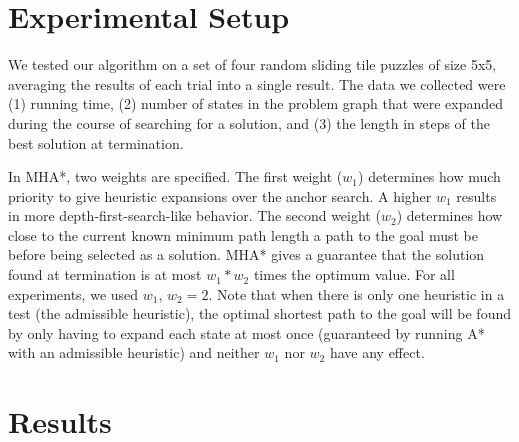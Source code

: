 \documentclass{article}
\begin{document}
\section{Experimental Setup}

We tested our algorithm on a set of four random sliding tile puzzles of size 5x5, averaging the results of each trial into a single result. The data we collected were (1) running time, (2) number of states in the problem graph that were expanded during the course of searching for a solution, and (3) the length in steps of the best solution at termination.




In MHA*, two weights are specified. The first weight ($w_1$) determines how much priority to give heuristic expansions over the anchor search. A higher $w_1$ results in more depth-first-search-like behavior. The second weight ($w_2$) determines how close to the current known minimum path length a path to the goal must be before being selected as a solution. MHA* gives a guarantee that the solution found at termination is at most $w_1 * w_2$ times the optimum value. For all experiments, we used $w_1$, $w_2 = 2$. Note that when there is only one heuristic in a test (the admissible heuristic), the optimal shortest path to the goal will be found by only having to expand each state at most once (guaranteed by running A* with an admissible heuristic) and neither $w_1$ nor $w_2$ have any effect.

\section{Results}
\end{document}

